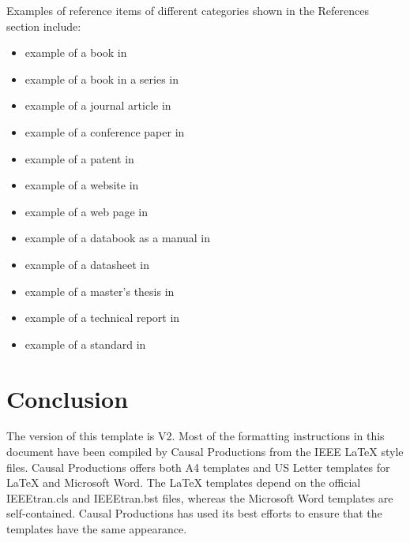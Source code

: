 \documentclass[10pt,conference,a4paper]{IEEEtran}
\begin{document}
Examples of reference items of different categories shown in the
References section include:

\begin{itemize}
\item	example of a book in \cite{IEEEexample:book}
\item	example of a book in a series in \cite{IEEEexample:bookwithseriesvolume}
\item	example of a journal article in \cite{IEEEexample:article_typical}
\item	example of a conference paper in \cite{IEEEexample:confwithpaper}
\item	example of a patent in \cite{IEEEexample:uspat}
\item	example of a website in \cite{IEEEexample:IEEEwebsite}
\item	example of a web page in \cite{IEEEexample:shellCTANpage}
\item	example of a databook as a manual in \cite{IEEEexample:motmanual}
\item	example of a datasheet in \cite{IEEEexample:datasheet}
\item	example of a master's thesis in \cite{IEEEexample:masterstype}
\item	example of a technical report in \cite{IEEEexample:techreptype}
\item	example of a standard in \cite{IEEEexample:standard}
\end{itemize}

\enlargethispage{-62mm}

\section{Conclusion}

The version of this template is V2.  Most of the formatting
instructions in this document have been compiled by Causal Productions
from the IEEE LaTeX style files.  Causal Productions offers both A4
templates and US Letter templates for LaTeX and Microsoft Word.  The
LaTeX templates depend on the official IEEEtran.cls and IEEEtran.bst
files, whereas the Microsoft Word templates are self-contained.
Causal Productions has used its best efforts to ensure that the
templates have the same appearance.
\end{document}
